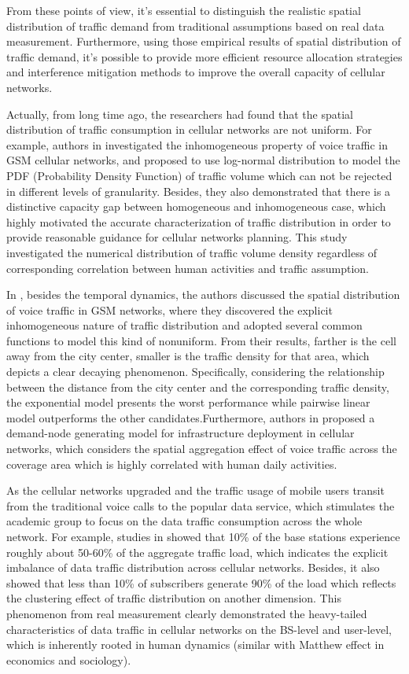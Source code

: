From these points of view, it's essential to distinguish the realistic spatial distribution of traffic demand from traditional assumptions based on real data measurement. Furthermore, using those empirical results of spatial distribution of traffic demand, it's possible to provide more efficient resource allocation strategies and interference mitigation methods to improve the overall capacity of cellular networks.

Actually, from long time ago, the researchers had found that the spatial distribution of traffic consumption in cellular networks are not uniform. For example, authors in \cite{gotzner1998spatial} investigated the inhomogeneous property of voice traffic in GSM cellular networks, and proposed to use log-normal distribution to model the PDF (Probability Density Function) of traffic volume which can not be rejected in different levels of granularity. Besides, they also demonstrated that there is a distinctive capacity gap between homogeneous and inhomogeneous case, which highly motivated the accurate characterization of traffic distribution in order to provide reasonable guidance for cellular networks planning. This study investigated the numerical distribution of traffic volume density regardless of corresponding correlation between human activities and traffic assumption.

In \cite{almeida1999spatial}, besides the temporal dynamics, the authors discussed the spatial distribution of voice traffic in GSM networks, where they discovered the explicit inhomogeneous nature of traffic distribution and adopted several common functions to model this kind of nonuniform. From their results, farther is the cell away from the city center, smaller is the traffic density for that area, which depicts a clear decaying phenomenon. Specifically, considering the relationship between the distance from the city center and the corresponding traffic density, the exponential model presents the worst performance while pairwise linear model outperforms the other candidates.Furthermore, authors in \cite{tutschku1998spatial} proposed a demand-node generating model for infrastructure deployment in cellular networks, which considers the spatial aggregation effect of voice traffic across the coverage area which is highly correlated with human daily activities.

As the cellular networks upgraded and the traffic usage of mobile users transit from the traditional voice calls to the popular data service, which stimulates the academic group to focus on the data traffic consumption across the whole network. For example, studies in \cite{paul2011understanding} showed that 10\% of the base stations experience roughly about 50-60\% of the aggregate traffic load, which indicates the explicit imbalance of data traffic distribution across cellular networks. Besides, it also showed that less than 10\% of subscribers generate 90\% of the load which reflects the clustering effect of traffic distribution on another dimension. This phenomenon from real measurement clearly demonstrated the heavy-tailed characteristics of data traffic in cellular networks on the BS-level and user-level, which is inherently rooted in human dynamics (similar with Matthew effect in economics and sociology).

